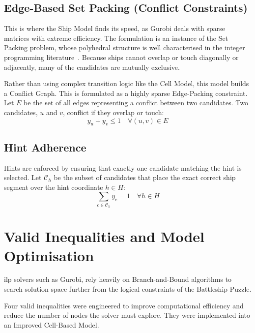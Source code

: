 \subsection{Edge-Based Set Packing (Conflict Constraints)}\label{subsec:edge-based-set-packing}
This is where the Ship Model finds its speed, as Gurobi deals with sparse matrices with extreme efficiency. The formulation is an instance of the Set Packing problem, whose polyhedral structure is well characterised in the integer programming literature~\citep{padberg1973facial,wolsey1998integer}. Because ships cannot overlap or touch diagonally or adjacently, many of the candidates are mutually exclusive.

Rather than using complex transition logic like the Cell Model, this model builds a Conflict Graph. This is formulated as a highly sparse Edge-Packing constraint. Let $E$ be the set of all edges representing a conflict between two candidates. Two candidates, $u$ and $v$, conflict if they overlap or touch:
\begin{equation}\label{eq:ship-edge-packing}
    y_u + y_v \leq 1 \quad \forall (u, v) \in E
\end{equation}

\subsection{Hint Adherence}\label{subsec:hint-adherence}
Hints are enforced by ensuring that exactly one candidate matching the hint is selected. Let $\mathcal{C}_h$ be the subset of candidates that place the exact correct ship segment over the hint coordinate $h \in H$:
\begin{equation}
    \sum_{c \in \mathcal{C}_h} y_c = 1 \quad \forall h \in H
\end{equation}

\section{Valid Inequalities and Model Optimisation}\label{sec:valid_inequalities}

\gls{ilp} solvers such as Gurobi, rely heavily on Branch-and-Bound algorithms to search solution space further from the logical constraints of the Battleship Puzzle.

Four valid inequalities were engineered to improve computational efficiency and reduce the number of nodes the solver must explore. They were implemented into an Improved Cell-Based Model.

